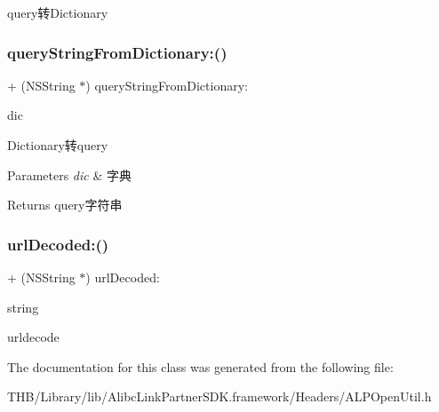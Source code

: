 query转\+Dictionary \mbox{\label{interface_a_l_p_open_util_a2a05c0902ba02d01d6a35f633e0f46b2}} 
\subsubsection{\texorpdfstring{query\+String\+From\+Dictionary\+:()}{queryStringFromDictionary:()}}
{\footnotesize\ttfamily + (N\+S\+String $\ast$) query\+String\+From\+Dictionary\+: \begin{DoxyParamCaption}\item[{(N\+S\+Dictionary $\ast$)}]{dic }\end{DoxyParamCaption}}

Dictionary转query


\begin{DoxyParams}{Parameters}
{\em dic} & 字典\\
\hline
\end{DoxyParams}
\begin{DoxyReturn}{Returns}
query字符串 
\end{DoxyReturn}
\mbox{\label{interface_a_l_p_open_util_af5a7d624f1f1c4fc03ef437d358d1763}} 
\subsubsection{\texorpdfstring{url\+Decoded\+:()}{urlDecoded:()}}
{\footnotesize\ttfamily + (N\+S\+String $\ast$) url\+Decoded\+: \begin{DoxyParamCaption}\item[{(N\+S\+String $\ast$)}]{string }\end{DoxyParamCaption}}

urldecode 

The documentation for this class was generated from the following file\+:\begin{DoxyCompactItemize}
\item 
T\+H\+B/\+Library/lib/\+Alibc\+Link\+Partner\+S\+D\+K.\+framework/\+Headers/A\+L\+P\+Open\+Util.\+h\end{DoxyCompactItemize}
